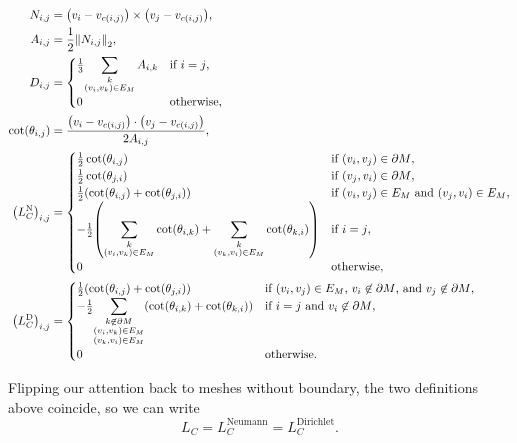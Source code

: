 \begin{align*}
	N_{i, j} &= \pof{v_i - v_{c\pof{i, j}}} \times \pof{v_j - v_{c\pof{i, j}}}, \\
	A_{i, j} &= \frac{1}{2}\norm{N_{i, j}}_2, \\
	D_{i, j} &= \begin{cases}
		\frac{1}{3}{\displaystyle\sum_{\substack{k \\ \pof{v_i, v_k} \in E_M}}A_{i, k}} & \text{if \(i = j\)}, \\
		0 & \text{otherwise},
	\end{cases} \\
	\cot\pof{\theta_{i, j}} &= \frac{\pof{v_i - v_{c\pof{i, j}}} \cdot \pof{v_j - v_{c\pof{i, j}}}}{2A_{i, j}}, \\
	\pof{L_C^{\text{N}}}_{i, j} &= \begin{cases}
		\frac{1}{2}\cot\pof{\theta_{i, j}} & \text{if \(\pof{v_i, v_j} \in \partial M\)}, \\
		\frac{1}{2}\cot\pof{\theta_{j, i}} & \text{if \(\pof{v_j, v_i} \in \partial M\)}, \\
		\frac{1}{2}\pof{\cot\pof{\theta_{i, j}} + \cot\pof{\theta_{j, i}}} & \text{if \(\pof{v_i, v_j} \in E_M\) and \(\pof{v_j, v_i} \in E_M\)}, \\
		-\frac{1}{2}\pof{\displaystyle\sum_{\substack{k \\ \pof{v_i, v_k} \in E_M}}\cot\pof{\theta_{i, k}} + \sum_{\substack{k \\ \pof{v_k, v_i} \in E_M}}\cot\pof{\theta_{k, i}}} & \text{if \(i = j\)}, \\
		0 & \text{otherwise},
	\end{cases} \\
	\pof{L_C^{\text{D}}}_{i, j} &= \begin{cases}
		\frac{1}{2}\pof{\cot\pof{\theta_{i, j}} + \cot\pof{\theta_{j, i}}} & \text{if \(\pof{v_i, v_j} \in E_M\), \(v_i \not\in \partial M\), and \(v_j \not\in \partial M\)}, \\
		-\frac{1}{2}{\displaystyle\sum_{\substack{k \not\in \partial M \\ \pof{v_i, v_k} \in E_M \\ \pof{v_k, v_i} \in E_M}}\pof{\cot\pof{\theta_{i, k}} + \cot\pof{\theta_{k, i}}}} & \text{if \(i = j\) and \(v_i \not\in \partial M\)}, \\
		0 & \text{otherwise}.
	\end{cases}
\end{align*}

Flipping our attention back to meshes without boundary, the two definitions above coincide, so we can write \[L_C = L_C^{\text{Neumann}} = L_C^{\text{Dirichlet}}.\]

